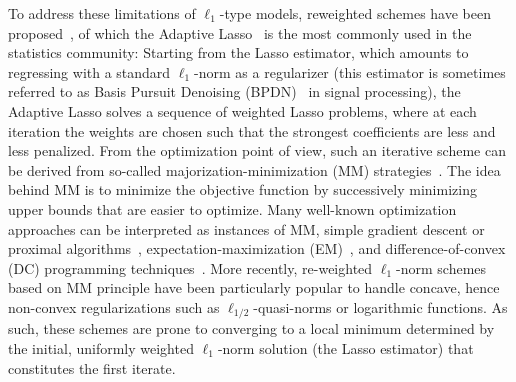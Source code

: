 To address these limitations of $\ell_1$-type models,
reweighted schemes have been
proposed~\cite{Candes,Gasso,Rakotomamonjy,zhang-rao:2011,strohmeier-etal:16}, of which the Adaptive Lasso~\cite{Zou06} is the most commonly used in the statistics community:
Starting from the Lasso estimator, which amounts to regressing with a standard $\ell_1$-norm as a regularizer (this estimator is sometimes referred to as Basis Pursuit Denoising (BPDN)~\cite{Chen_Donoho_Saunders98} in signal processing), the Adaptive Lasso solves a sequence of weighted Lasso problems, where at each iteration the
weights are chosen such that the strongest coefficients are less and less penalized.
From the optimization point of view, such an iterative scheme can be derived from so-called majorization-minimization (MM) strategies~\cite{lange2000optimization,schifano2010majorization}.
The idea behind MM is to minimize the objective function by successively minimizing upper bounds that are easier to optimize. Many well-known optimization approaches can be interpreted as instances of MM, \eg simple gradient descent or proximal algorithms~\cite{Combettes2011}, expectation-maximization (EM)~\cite{Dempster77maximumlikelihood}, and difference-of-convex (DC) programming techniques~\cite{Horst:1999}.
%
More recently, re-weighted $\ell_1$-norm schemes based on MM principle have been particularly popular to handle concave, hence non-convex regularizations such as $\ell_{1/2}$-quasi-norms or logarithmic functions. As such, these schemes are prone to converging to a local minimum determined by the initial, uniformly weighted $\ell_1$-norm solution (\ie the Lasso estimator) that constitutes the first iterate.\\

